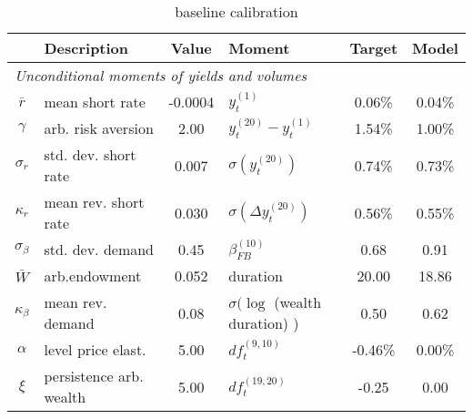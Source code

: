 \begin{table}[htbp]  
\centering  
\bgroup  
\def\arraystretch{1.25}  
\begin{tabular}{clclcc} \hline  
& Description & Value & Moment & Target & Model \\ \hline  
\multicolumn{6}{l}{\emph{Unconditional moments of yields and volumes}} \\  
$\bar{r}$  & mean short rate & -0.0004  & $y_{t}^{(1)}$ & 0.06\% & 0.04\%   \\ 
$\gamma$  & arb. risk aversion & 2.00  & $y_{t}^{(20)}-y_{t}^{(1)}$ & 1.54\% & 1.00\%   \\ 
$\sigma_r$ & std. dev. short rate & 0.007 & $\sigma ( y_{t}^{(20)} )$  & 0.74\% & 0.73\% \\ 
$\kappa_r$ & mean rev. short rate & 0.030 & $\sigma (\Delta y_{t}^{(20)})$ & 0.56\% & 0.55\% \\ 
$\sigma_{\beta}$ & std. dev. demand & 0.45 & $ \beta^{(10)}_{FB} $ & 0.68 & 0.91 \\ 
$\bar{W}$ & arb.endowment & 0.052 & duration & 20.00 & 18.86 \\ 
$\kappa_{\beta}$ & mean rev. demand & 0.08 & $\sigma (\log $ (wealth duration) ) & 0.50 & 0.62 \\ 
$\alpha$ & level price elast. & 5.00 & $ df_t^{(9,10)} $ & -0.46\% & 0.00\% \\ 
$\xi$ & persistence arb. wealth & 5.00 & $ df_t^{(19,20)} $ & -0.25 & 0.00 \\ 
\end{tabular} 
\egroup 
\caption{baseline calibration} 
\label{tab:cal} 
\end{table} 
